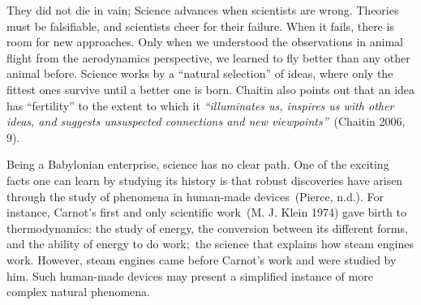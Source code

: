 \documentclass[
  letterpaper,
  12pt,
  british]{tufte-book}
\theoremstyle{plain}
\theoremstyle{plain}
\theoremstyle{definition}
\theoremstyle{remark}
\begin{document}
They did not die in vain;
Science advances when scientists are wrong. Theories must be
falsifiable, and scientists cheer for their failure. When it fails,
there is room for new approaches. Only when we understood the
observations in animal flight from the aerodynamics perspective, we
learned to fly better than any other animal before. Science works by a
``natural selection'' of ideas, where only the fittest ones survive
until a better one is born. Chaitin also points out that an idea has
``fertility'' to the extent to which it \emph{``illuminates us, inspires
us with other ideas, and suggests unsuspected connections and new
viewpoints''}~(Chaitin 2006,
9).

Being a Babylonian enterprise, science has no clear path. One of the
exciting facts one can learn by studying its history is that robust
discoveries have arisen through the study of phenomena in human-made
devices~(Pierce,
n.d.).
For instance, Carnot's first and only scientific work~(M. J. Klein
1974)
gave birth to thermodynamics: the study of energy, the conversion
between its different forms, and the ability of energy to do work;~the
science that explains how steam engines work. However, steam engines
came before Carnot's work and were studied by him. Such human-made
devices may present a simplified instance of more complex natural
phenomena.
\end{document}
